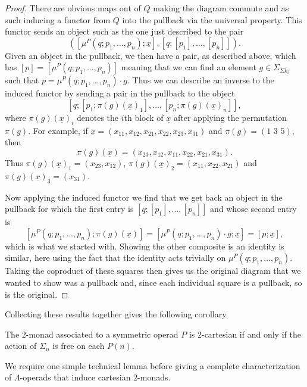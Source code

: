 \begin{proof}
There are obvious maps out of $Q$ making the diagram commute and as such inducing a functor from $Q$ into the pullback via the universal property. This functor sends an object such as the one just described to the pair
    \[
        \left(\left[\mu^P(q;p_1,\ldots,p_n);\underline{x}\right], [q;[p_1],\ldots,[p_n]]\right).
    \]
Given an object in the pullback, we then have a pair, as described above, which has $[p] = [\mu^P(q;p_1,\ldots,p_n)]$ meaning that we can find an element $g \in \Sigma_{\Sigma k_i}$ such that $p  = \mu^P(q;p_1,\ldots,p_n) \cdot g$. Thus we can describe an inverse to the induced functor by sending a pair in the pullback to the object
    \[
        [q;[p_1;\pi(g)(\underline{x})_1],\ldots,[p_n;\pi(g)(\underline{x})_n]],
    \]
where $\pi(g)(\underline{x})_i$ denotes the $i$th block of $\underline{x}$ after applying the permutation $\pi(g)$. For example, if $\underline{x} = (x_{11}, x_{12}, x_{21}, x_{22}, x_{23}, x_{31})$ and $\pi(g) = (1\, \, 3 \, \, 5)$, then
    \[
        \pi(g)(\underline{x}) = (x_{23}, x_{12}, x_{11}, x_{22}, x_{21}, x_{31}).
    \]
Thus $\pi(g)(\underline{x})_1 = (x_{23}, x_{12})$, $\pi(g)(\underline{x})_2 = (x_{11}, x_{22}, x_{21})$ and $\pi(g)(\underline{x})_3 = (x_{31})$.

Now applying the induced functor we find that we get back an object in the pullback for which the first entry is $[q;[p_1],\ldots,[p_n]]$ and whose second entry is
    \[
       \left[\mu^P(q;p_1,\ldots,p_n);\pi(g)(\underline{x})\right] = \left[\mu^P(q;p_1,\ldots,p_n) \cdot g;\underline{x}\right] = [p;\underline{x}],
    \]
which is what we started with. Showing the other composite is an identity is similar, here using the fact that the identity acts trivially on $\mu^P(q;p_1,\ldots,p_n)$. Taking the coproduct of these squares then gives us the original diagram that we wanted to show was a pullback and, since each individual square is a pullback, so is the original.
\end{proof}

Collecting these results together gives the following corollary.

\begin{cor}\label{cor:cart_cor}
The $2$-monad associated to a symmetric operad $P$ is $2$-cartesian if and only if the action of $\Sigma_n$ is free on each $P(n)$.
\end{cor}

We require one simple technical lemma before giving a complete characterization of $\Lambda$-operads that induce cartesian $2$-monads.

